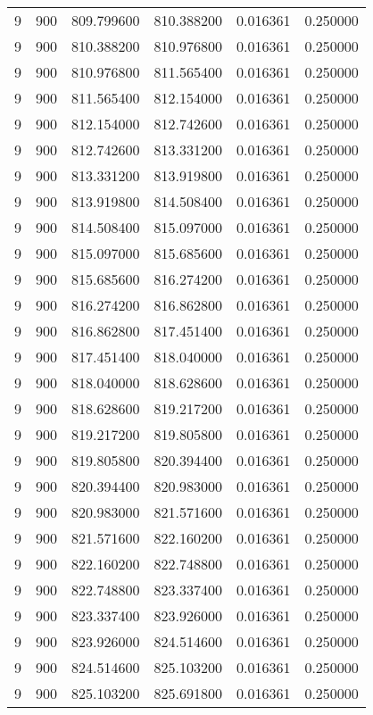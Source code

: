 \begin{longtable}{rrrrrr}
9 & 900 & 809.799600 & 810.388200 & 0.016361 & 0.250000 \\
9 & 900 & 810.388200 & 810.976800 & 0.016361 & 0.250000 \\
9 & 900 & 810.976800 & 811.565400 & 0.016361 & 0.250000 \\
9 & 900 & 811.565400 & 812.154000 & 0.016361 & 0.250000 \\
9 & 900 & 812.154000 & 812.742600 & 0.016361 & 0.250000 \\
9 & 900 & 812.742600 & 813.331200 & 0.016361 & 0.250000 \\
9 & 900 & 813.331200 & 813.919800 & 0.016361 & 0.250000 \\
9 & 900 & 813.919800 & 814.508400 & 0.016361 & 0.250000 \\
9 & 900 & 814.508400 & 815.097000 & 0.016361 & 0.250000 \\
9 & 900 & 815.097000 & 815.685600 & 0.016361 & 0.250000 \\
9 & 900 & 815.685600 & 816.274200 & 0.016361 & 0.250000 \\
9 & 900 & 816.274200 & 816.862800 & 0.016361 & 0.250000 \\
9 & 900 & 816.862800 & 817.451400 & 0.016361 & 0.250000 \\
9 & 900 & 817.451400 & 818.040000 & 0.016361 & 0.250000 \\
9 & 900 & 818.040000 & 818.628600 & 0.016361 & 0.250000 \\
9 & 900 & 818.628600 & 819.217200 & 0.016361 & 0.250000 \\
9 & 900 & 819.217200 & 819.805800 & 0.016361 & 0.250000 \\
9 & 900 & 819.805800 & 820.394400 & 0.016361 & 0.250000 \\
9 & 900 & 820.394400 & 820.983000 & 0.016361 & 0.250000 \\
9 & 900 & 820.983000 & 821.571600 & 0.016361 & 0.250000 \\
9 & 900 & 821.571600 & 822.160200 & 0.016361 & 0.250000 \\
9 & 900 & 822.160200 & 822.748800 & 0.016361 & 0.250000 \\
9 & 900 & 822.748800 & 823.337400 & 0.016361 & 0.250000 \\
9 & 900 & 823.337400 & 823.926000 & 0.016361 & 0.250000 \\
9 & 900 & 823.926000 & 824.514600 & 0.016361 & 0.250000 \\
9 & 900 & 824.514600 & 825.103200 & 0.016361 & 0.250000 \\
9 & 900 & 825.103200 & 825.691800 & 0.016361 & 0.250000 \\

\end{longtable}
